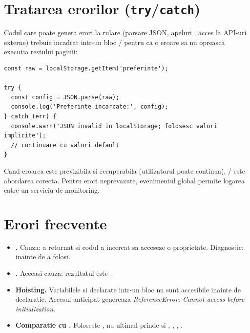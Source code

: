 \section{Tratarea erorilor (\texttt{try}/\texttt{catch})}

Codul care poate gen\-era erori la rulare (parsare JSON, apeluri , acces la API-uri externe) trebuie incadrat intr-un bloc / pentru ca o eroare sa nu opreasca executia restului paginii:

\begin{lstlisting}[style=js, caption={Parsare JSON cu fallback}]
const raw = localStorage.getItem('preferinte');

try {
  const config = JSON.parse(raw);
  console.log('Preferinte incarcate:', config);
} catch (err) {
  console.warn('JSON invalid in localStorage; folosesc valori implicite');
  // continuare cu valori default
}
\end{lstlisting}

Cand eroarea este previzibila si recuperabila (utilizatorul poate continua), / este abordarea corecta. Pentru erori neprevazute, evenimentul global  permite logarea catre un serviciu de monitoring.

\section{Erori frecvente}

\begin{itemize}
  \item \textbf{.} Cauza:  a returnat  si codul a incercat sa acceseze o proprietate. Diagnostic:  inainte de a folosi.
  \item \textbf{.} Aceeasi cauza: rezultatul  este .
  \item \textbf{Hoisting.} Variabilele  si  declarate intr-un bloc nu sunt accesibile inainte de declaratie. Accesul anticipat genereaza \emph{ReferenceError: Cannot access before initialization}.
  \item \textbf{Comparatie cu .} Foloseste , nu  \textendash{} ultimul prinde si , , , .
\end{itemize}

